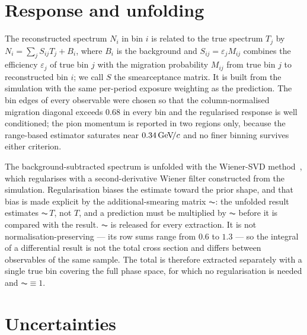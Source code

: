 \documentclass[aps,prd,twocolumn,superscriptaddress,nofootinbib,floatfix]{revtex4-2}
\begin{document}
\section{Response and unfolding}
\label{sec:unfolding}

The reconstructed spectrum $N_i$ in bin $i$ is related to the true spectrum $T_j$ by
$N_i=\sum_j S_{ij}T_j+B_i$, where $B_i$ is the background and $S_{ij}=\varepsilon_j M_{ij}$
combines the efficiency $\varepsilon_j$ of true bin $j$ with the migration probability $M_{ij}$
from true bin $j$ to reconstructed bin $i$; we call $S$ the smearceptance matrix. It is built from
the simulation with the same per-period exposure weighting as the prediction. The bin edges of
every observable were chosen so that the column-normalised migration diagonal exceeds $0.68$ in
every bin and the regularised response is well conditioned; the pion momentum is reported in two
regions only, because the range-based estimator saturates near $0.34\,\text{GeV}\!/c$ and no finer binning
survives either criterion.

The background-subtracted spectrum is unfolded with the Wiener-SVD method~\cite{wienervsd}, which
regularises with a second-derivative Wiener filter constructed from the simulation. Regularisation
biases the estimate toward the prior shape, and that bias is made explicit by the
additional-smearing matrix $\AC$: the unfolded result estimates $\AC\,T$, not $T$, and a prediction
must be multiplied by $\AC$ before it is compared with the result. $\AC$ is released for every
extraction. It is not normalisation-preserving --- its row sums range from $0.6$ to $1.3$ --- so
the integral of a differential result is not the total cross section and differs between
observables of the same sample. The total is therefore extracted separately with a single true bin
covering the full phase space, for which no regularisation is needed and $\AC\equiv1$.

\section{Uncertainties}
\label{sec:syst}
\end{document}

